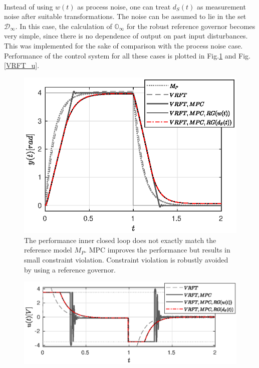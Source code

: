 \documentclass[letterpaper, 10 pt, conference]{ieeeconf}  %
\begin{document}
\begin{enumerate}
	\\
	Instead of using $w(t)$ as process noise, one can treat $d_S(t)$ as measurement noise after suitable transformations. The noise can be assumed to lie in the set $\mathcal{D}_{\infty}$. In this case, the calculation of $\mathbb{O}_{\infty}$ for the robust reference governor becomes very simple, since there is no dependence of output on past input disturbances. This was implemented for the sake of comparison with the process noise case. \\
	Performance of the control system for all these cases is plotted in Fig.\ref{VRFT_y} and Fig.\ref{VRFT_u}.
	\vspace{-10pt}
	\begin{figure}[h]
		\hspace{30pt}
		\includegraphics[scale = 0.55]{VRFT_vs_MPC.eps}
		\caption{The performance inner closed loop does not exactly match the reference model $M_P$. MPC improves the performance but results in small constraint violation. Constraint violation is robustly avoided by using a reference governor.}
		\label{VRFT_y}
	\end{figure} 
	\vspace{-20pt}
	\begin{figure}[h]
		\hspace{20pt}
		\includegraphics[scale = 0.55]{VRFT_vs_MPC_u.eps}

\end{figure}
\end{enumerate}
\end{document}
